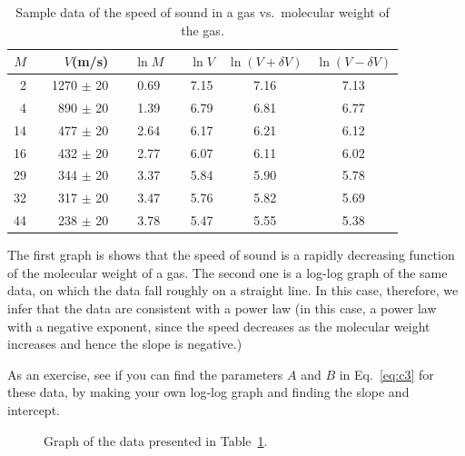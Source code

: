 \begin{table}[hbt!]
\begin{center}
\begin{tabular}{|rcrcccccc|}
\hline
$M$ & \hspace{6pt} & $V$(m/s) & \hspace{6pt}
& $\ln M$ & \hspace{6pt} & $\ln V$ & $\ln(V + \delta V)$ & $\ln (V
- \delta V)$ \\ \hline

2  & & 1270 $\pm$ 20 &  & 0.69 & &  7.15 & 7.16 & 7.13  \\
4  & & 890  $\pm$ 20 &  & 1.39 & &  6.79 & 6.81 & 6.77  \\
14 & & 477  $\pm$ 20 &  & 2.64 & &  6.17 & 6.21 & 6.12  \\
16 & & 432  $\pm$ 20 &  & 2.77 & &  6.07 & 6.11 & 6.02  \\
29 & & 344  $\pm$ 20 &  & 3.37 & &  5.84 & 5.90 & 5.78  \\
32 & & 317  $\pm$ 20 &  & 3.47 & &  5.76 & 5.82 & 5.69  \\
44 & & 238  $\pm$ 20 &  & 3.78 & &  5.47 & 5.55 & 5.38  \\ \hline
\end{tabular}
\end{center}
\caption{Sample data of the speed of sound in a gas vs.\ molecular weight of
the gas.  \label{table:speed}}
\end{table}

The first graph is shows that the speed of sound is a rapidly
decreasing function of the molecular weight of a gas. The second one
is a log-log graph of the same data,
on which the data fall roughly on a straight line.  In this case,
therefore, we infer that the data are consistent with a power law (in
this case, a power law with a negative exponent, since the speed
decreases as the molecular weight increases and hence the slope
is negative.)

As an exercise, see if you can find the parameters $A$ and $B$ in
Eq.~\ref{eq:c3} for
these data, by making your own log-log graph and finding the slope and
intercept.

\begin{figure}[!hbt]    %
\begin{center}
{}
\end{center}
\caption{Graph of the data presented in Table~\protect\ref{table:speed}.
          \label{fig:speed}}
\end{figure}

